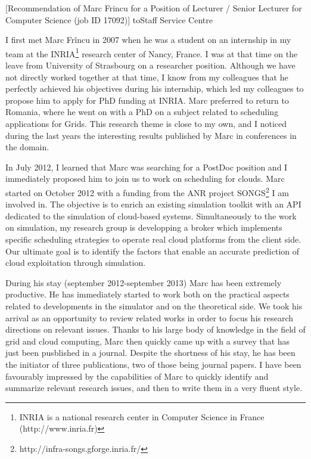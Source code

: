 \documentclass[a4paper,10pt]{article}
\begin{document}

\begin{letter}[Recommendation of Marc Frincu for a Position of Lecturer / Senior Lecturer for Computer Science (job ID 17092)]%
{to}{Staff Service Centre}
 

I first met Marc  Fr\^incu in 2007 when he was a student  on an internship in my
team  at the  INRIA\footnote{INRIA is  a  national research  center in  Computer
  Science in France (http://www.inria.fr)} research  center of Nancy, France.  I
was at  that time  on the leave  from University of  Strasbourg on  a researcher
position. Although  we have not  directly worked together  at that time,  I know
from  my  colleagues  that  he  perfectly achieved  his  objectives  during  his
internship, which led  my colleagues to propose him to apply for PhD funding at INRIA.
%
Marc preferred to  return to Romania, where he  went on with a PhD  on a subject
related to scheduling applications for Grids. This research theme is close to my
own, and I  noticed during the last years the  interesting results published by
Marc in conferences in the domain.

In July  2012, I learned that  Marc was searching  for a PostDoc position  and I
immediately  proposed him  to join  us to  work on  scheduling for  clouds. Marc
started   on   October   2012   with    a   funding   from   the   ANR   project
SONGS\footnote{http://infra-songs.gforge.inria.fr/}  I  am   involved  in.   The
objective is to  enrich an existing simulation toolkit with  an API dedicated to
the simulation of cloud-based systems.
%
Simultaneously to  the work on  simulation, my  research group is  developping a
broker which  implements specific  scheduling strategies  to operate  real cloud
platforms from  the client side.  Our ultimate goal  is to identify  the factors
that enable an accurate prediction of cloud exploitation through simulation.

During  his  stay  (september  2012-september  2013)  Marc  has  been  extremely
productive. He  has immediately started  to work  both on the  practical aspects
related to  developments in the simulator  and on the theoretical  side. We took
his arrival  as an  opportunity to review  related works in  order to  focus his
research directions on relevant issues. Thanks to his large body of knowledge in
the field of grid  and cloud computing, Marc then quickly came  up with a survey
that has just been  pusblished in a journal. Despite the  shortness of his stay,
he has  been the  initiator of  three publications, two  of those  being journal
papers. I have been favourably impressed  by the capabilities of Marc to quickly
identify and  summarize relevant research  issues, and then  to write them  in a
very fluent style.


\end{letter}
\end{document}
